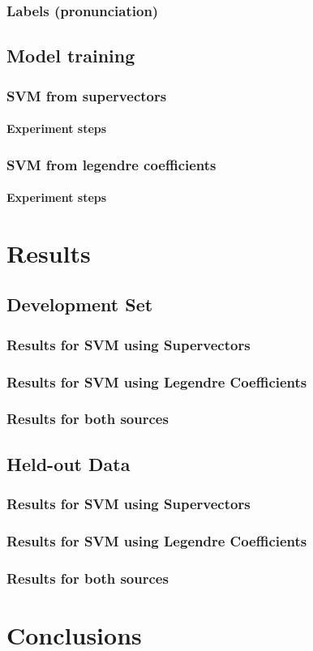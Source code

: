 \documentclass[11pt,a4paper]{tesis}
\begin{document}
		\subsection{Labels (pronunciation)}
			
	\section{Model training}
		\subsection{SVM from supervectors}
			\subsubsection{Experiment steps}
				
		\subsection{SVM from legendre coefficients}
			\subsubsection{Experiment steps}
				

\chapter{Results}
	\section{Development Set}
		\subsection{Results for SVM using Supervectors}
			
		\subsection{Results for SVM using Legendre Coefficients}
			
		\subsection{Results for both sources}
			
	\section{Held-out Data}
		\subsection{Results for SVM using Supervectors}
		\subsection{Results for SVM using Legendre Coefficients}
		\subsection{Results for both sources}
\chapter{Conclusions}

\printbibliography
 
\end{document}
